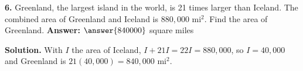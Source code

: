 \documentclass{ximera}
\begin{document}
\begin{problem}
\textbf{6.} Greenland, the largest island in the world, is 21 times larger than Iceland.
The combined area of Greenland and Iceland is $880{,}000$ mi$^{2}$. Find the area of
Greenland. \qquad \textbf{Answer:} $\answer{840000}$ square miles

\begin{hint}
\textbf{Solution.} With $I$ the area of Iceland, $I+21I=22I=880{,}000$, so $I=40{,}000$
and Greenland is $21(40{,}000)=840{,}000$ mi$^{2}$.
\end{hint}
\end{problem}
\end{document}
